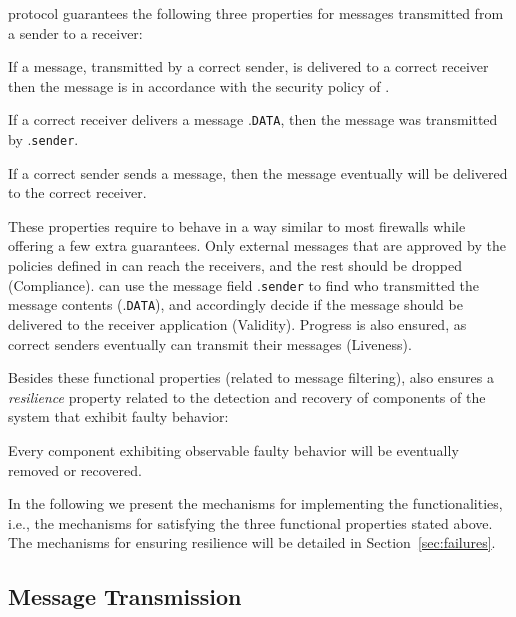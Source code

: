 \sieveq protocol guarantees the following three properties for messages transmitted from a sender to a receiver:

\begin{security}
If a message, transmitted by a correct sender, is delivered to a correct receiver then the message is in accordance with the security policy of \sieveq.
\end{security}

\begin{validity}
If a correct receiver delivers a message \msg.\texttt{DATA}, then the message was transmitted by \msg.\texttt{sender}.
\end{validity}

\begin{liveness}
If a correct sender sends a message, then the message eventually will be delivered to the correct receiver.
\end{liveness}

These properties require \sieveq to behave in a way similar to most firewalls while offering a few extra guarantees. 
Only external messages that are approved by the policies defined in \sieveq can reach the receivers, and the rest should be dropped (Compliance). 
\Postsieve can use the message field \msg.\texttt{sender} to find who transmitted the message contents (\msg.\texttt{DATA}), and accordingly decide if the message should be delivered to the receiver application (Validity). 
Progress is also ensured, as correct senders eventually can transmit their messages (Liveness).

Besides these functional properties (related to message filtering), \sieveq also ensures a \emph{resilience} property related to the detection and recovery of components of the system that exhibit faulty behavior:


\begin{resilience}
Every component exhibiting observable faulty behavior will be eventually removed or recovered.
\end{resilience}

In the following we present the mechanisms for implementing the \sieveq functionalities, i.e., the mechanisms for satisfying the three functional properties stated above.
The mechanisms for ensuring resilience will be detailed in Section~\ref{sec:failures}.

\subsection{Message Transmission}
\label{transmittingmessage}


